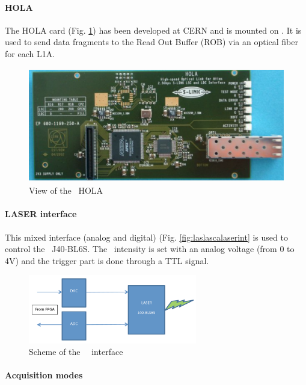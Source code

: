 \paragraph{HOLA}

The HOLA card \cite{ref:hola} (Fig. \ref{fig:laslascarhola}) has been developed at CERN and is mounted on \lascar. It is used to send data fragments to the Read Out Buffer (ROB) via an optical fiber for each L1A.
\begin{figure}[htbp]

\centering
\includegraphics[height=5cm]{figures/hola.pdf}
\caption{View of the \lascar~HOLA}\label{fig:laslascarhola}
\end{figure}

\paragraph{LASER interface}

This mixed interface (analog and digital) (Fig. \ref{fig:laslascalaserint} is used to control the \laser~J40-BL6S. The \laser~intensity is set with an analog voltage (from 0 to 4V) and the trigger part is done through a TTL signal.

\begin{figure}[htbp]

\centering
\includegraphics[height=3cm]{figures/laser_interface.pdf}
\caption{Scheme of the \lascar~\las~interface}\label{fig:laslascarlaserint}
\end{figure}

\paragraph{Acquisition modes}

